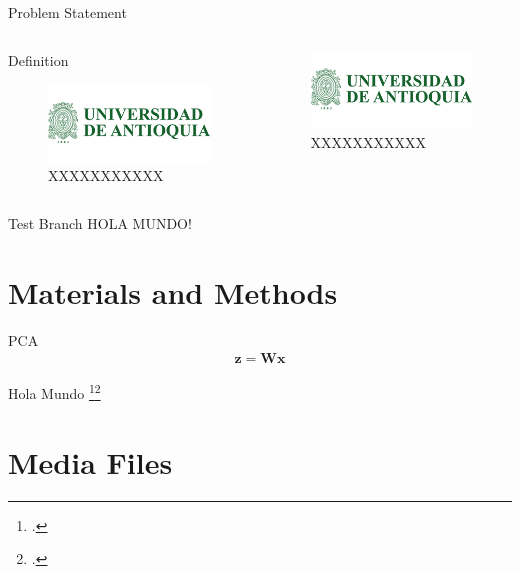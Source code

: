 \documentclass{beamer}
\begin{document}
\begin{frame}{Problem Statement}
\begin{columns}
	\begin{column}{0.45\linewidth}
		\begin{block}{Definition}
			\begin{figure}
				\includegraphics[width=0.5\linewidth]{logos/logoUdeA}
				\caption{XXXXXXXXXXX}
			\end{figure}
		\end{block}
	\end{column}
	\begin{column}{0.45\linewidth}
		\begin{figure}
			\includegraphics[width=0.5\linewidth]{logos/logoUdeA}
			\caption{XXXXXXXXXXX}
		\end{figure}
	\end{column}
\end{columns}

\end{frame}

\begin{frame}{Test Branch}
HOLA MUNDO! \cite{Rasmunssen05}
\end{frame}
	
	\section{Materials and Methods}
	
	\begin{frame}{PCA}
	\begin{align}
	\mathbf{z} = \mathbf{W}\mathbf{x} 
	\end{align}
	
	Hola Mundo \footcite{Rasmunssen05}\footcite{artTest}
\end{frame}

\section{Media Files}
\end{document}
